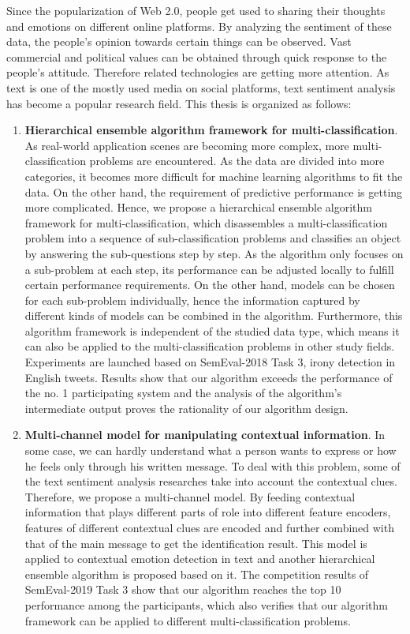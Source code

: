 \begin{eabstract}

Since the popularization of Web 2.0, people get used to sharing their thoughts and emotions on different online platforms. By analyzing the sentiment of these data, the people's opinion towards certain things can be observed. Vast commercial and political values can be obtained through quick response to the people's attitude. Therefore related technologies are getting more attention. As text is one of the mostly used media on social platforms, text sentiment analysis has become a popular research field. This thesis is organized as follows:

\begin{enumerate}

\item {\bf Hierarchical ensemble algorithm framework for multi-classification}. As real-world application scenes are becoming more complex, more multi-classification problems are encountered. As the data are divided into more categories, it becomes more difficult for machine learning algorithms to fit the data. On the other hand, the requirement of predictive performance is getting more complicated. Hence, we propose a hierarchical ensemble algorithm framework for multi-classification, which disassembles a multi-classification problem into a sequence of sub-classification problems and classifies an object by answering the sub-questions step by step. As the algorithm only focuses on a sub-problem at each step, its performance can be adjusted locally to fulfill certain performance requirements. On the other hand, models can be chosen for each sub-problem individually, hence the information captured by different kinds of models can be combined in the algorithm. Furthermore, this algorithm framework is independent of the studied data type, which means it can also be applied to the multi-classification problems in other study fields. Experiments are launched based on SemEval-2018 Task 3, irony detection in English tweets. Results show that our algorithm exceeds the performance of the no. 1 participating system and the analysis of the algorithm's intermediate output proves the rationality of our algorithm design. 

\item {\bf Multi-channel model for manipulating contextual information}. In some case, we can hardly understand what a person wants to express or how he feels only through his written message. To deal with this problem, some of the text sentiment analysis researches take into account the contextual clues. Therefore, we propose a multi-channel model. By feeding contextual information that plays different parts of role into different feature encoders, features of different contextual clues are encoded and further combined with that of the main message to get the identification result. This model is applied to contextual emotion detection in text and another hierarchical ensemble algorithm is proposed based on it. The competition results of SemEval-2019 Task 3 show that our algorithm reaches the top 10 performance among the participants, which also verifies that our algorithm framework can be applied to different multi-classification problems.


\end{enumerate}
\end{eabstract}
